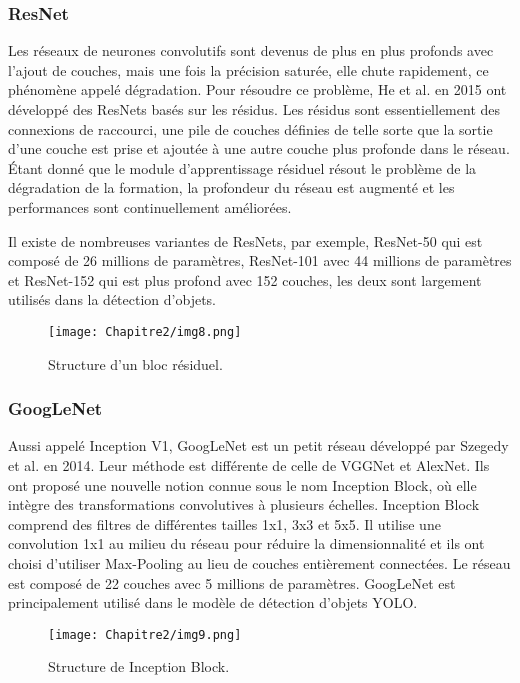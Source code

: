           \subsubsection{ResNet} \cite{resnet_paper}
          Les réseaux de neurones convolutifs sont devenus de plus en plus profonds avec l'ajout de couches, mais une fois la précision saturée, elle chute rapidement, ce phénomène appelé dégradation. Pour résoudre ce problème, He et al. en 2015 ont développé des ResNets basés sur les résidus. Les résidus sont essentiellement des connexions de raccourci, une pile de couches définies de telle sorte que la sortie d'une couche est prise et ajoutée à une autre couche plus profonde dans le réseau. Étant donné que le module d'apprentissage résiduel résout le problème de la dégradation de la formation, la profondeur du réseau est augmenté et les performances sont continuellement améliorées.

          Il existe de nombreuses variantes de ResNets, par exemple, ResNet-50 qui est composé de 26 millions de paramètres, ResNet-101 avec 44 millions de paramètres et ResNet-152 qui est plus profond avec 152 couches, les deux sont largement utilisés dans la détection d'objets.
          \begin{figure}[H]
               \centering
               \texttt{[image: Chapitre2/img8.png]}
               \caption{Structure d'un bloc résiduel.}
               \label{img8}
               \end{figure}
          
          \subsubsection{GoogLeNet} \cite{googlenet_paper}
          Aussi appelé Inception V1, GoogLeNet est un petit réseau développé par Szegedy et al. en 2014. Leur méthode est différente de celle de VGGNet et AlexNet. Ils ont proposé une nouvelle notion connue sous le nom Inception Block, où elle intègre des transformations convolutives à plusieurs échelles. Inception Block comprend des filtres de différentes tailles 1x1, 3x3 et 5x5. Il utilise une convolution 1x1 au milieu du réseau pour réduire la dimensionnalité et ils ont choisi d'utiliser Max-Pooling au lieu de couches entièrement connectées. Le réseau est composé de 22 couches avec 5 millions de paramètres. GoogLeNet est principalement utilisé dans le modèle de détection d'objets YOLO.
          \begin{figure}[H]
               \centering
               \texttt{[image: Chapitre2/img9.png]}
               \caption{Structure de Inception Block.}
               \label{img9}
               \end{figure}

